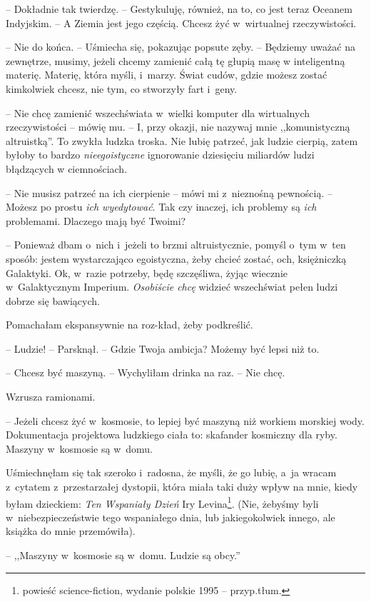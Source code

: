 \documentclass[oneside,polish,11pt,sfheadings]{mwbk}
\begin{document}
-- Dokładnie tak twierdzę. -- Gestykuluję, również, na to, co jest teraz
Oceanem Indyjskim. -- A Ziemia jest jego częścią. Chcesz żyć w~wirtualnej
rzeczywistości.

-- Nie do końca. -- Uśmiecha się, pokazując popsute zęby. -- Będziemy
uważać na zewnętrze, musimy, jeżeli chcemy zamienić całą tę głupią masę
w inteligentną materię. Materię, która myśli, i~marzy. Świat cudów,
gdzie możesz zostać kimkolwiek chcesz, nie tym, co stworzyły fart i~geny.

-- Nie chcę zamienić wszechświata w~wielki komputer dla wirtualnych
rzeczywistości -- mówię mu. -- I, przy okazji, nie nazywaj mnie
,,komunistyczną altruistką''. To zwykła ludzka troska. Nie lubię
patrzeć, jak ludzie cierpią, zatem byłoby to bardzo
\textit{nieegoistyczne} ignorowanie dziesięciu miliardów ludzi błądzących
w ciemnościach.

-- Nie musisz patrzeć na ich cierpienie -- mówi mi z~nieznośną pewnością.
-- Możesz po prostu \textit{ich wyedytować}. Tak czy inaczej, ich problemy
są \textit{ich} problemami. Dlaczego mają być Twoimi?

-- Ponieważ dbam o~nich i~jeżeli to brzmi altruistycznie, pomyśl o~tym w~ten sposób: jestem wystarczająco egoistyczna, żeby chcieć zostać, och,
księżniczką Galaktyki. Ok, w~razie potrzeby, będę szczęśliwa, żyjąc
wiecznie w~Galaktycznym Imperium. \textit{Osobiście chcę} widzieć
wszechświat pełen ludzi dobrze się bawiących.

Pomachałam ekspansywnie na roz-kład, żeby podkreślić.

-- Ludzie! -- Parsknął. -- Gdzie Twoja ambicja? Możemy być lepsi niż to.

-- Chcesz być maszyną. -- Wychyliłam drinka na raz. -- Nie chcę.

Wzrusza ramionami. 

-- Jeżeli chcesz żyć w~kosmosie, to lepiej być maszyną
niż workiem morskiej wody. Dokumentacja projektowa ludzkiego ciała to:
skafander kosmiczny dla ryby. Maszyny w~kosmosie są w~domu.

Uśmiechnęłam się tak szeroko i~radosna, że myśli, że go lubię, a~ja
wracam z~cytatem z~przestarzałej dystopii, która miała taki duży wpływ
na mnie, kiedy byłam dzieckiem: \textit{Ten Wspaniały Dzień} Iry
Levina\footnote{ powieść science-fiction, wydanie polskie 1995 -- przyp.tłum.}. (Nie, żebyśmy byli w~niebezpieczeństwie tego wspaniałego
dnia, lub jakiegokolwiek innego, ale książka do mnie przemówiła).

-- ,,Maszyny w~kosmosie są w~domu. Ludzie są obcy.''
\end{document}
